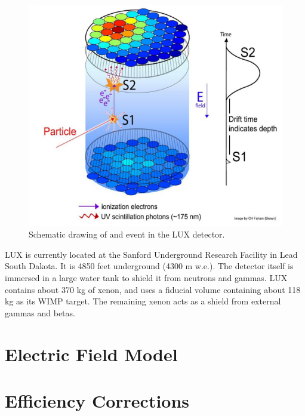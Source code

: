 \begin{figure}[h!]
\centering
\includegraphics[width=150mm]{Figures/luxevent.png}
\caption{Schematic drawing of and event in the LUX detector.\cite{lux2012}}
\label{fig:lux} 
\end{figure}

 LUX is currently located at the Sanford Underground Research Facility in Lead South Dakota. It is 4850 feet underground (4300 m w.e.). The detector itself is immersed in a large water tank to shield it from neutrons and gammas. LUX contains about 370 kg of xenon, and uses a fiducial volume containing about 118 kg as its WIMP target. The remaining xenon acts as a shield from external gammas and betas. 
 
 \section{Electric Field Model}
 
 
 \section{Efficiency Corrections}